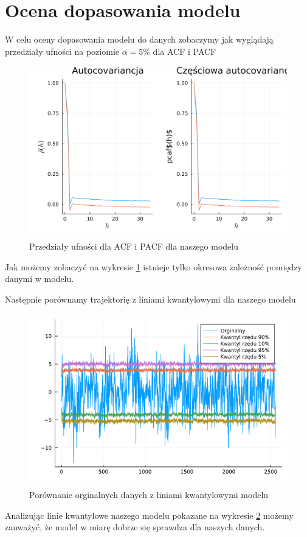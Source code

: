 \documentclass[12pt]{article}
\theoremstyle{exer}
\begin{document}
	
	
	\section{Ocena dopasowania modelu}
	W celu oceny dopasowania modelu do danych zobaczymy jak wyglądają przedziały ufności na poziomie $\alpha = 5\%$ dla ACF i PACF 
	\begin{figure}[H]
		\centering
		\includegraphics[width=3\columnwidth/4]{img/acf_pacf.png}
		\caption{Przedziały ufności dla ACF i PACF dla naszego modelu}
		\label{fig:model_acf_pacf}
	\end{figure}
	Jak możemy zobaczyć na wykresie \ref{fig:model_acf_pacf} istnieje tylko okresowa zależność pomiędzy danymi w modelu.
	
	
	Następnie porównamy trajektorię z liniami kwantylowymi dla naszego modelu
	\begin{figure}[H]
		\centering
		\includegraphics[width=3\columnwidth/4]{img/linie_kwantylowe.png}
		\caption{Porównanie orginalnych danych z liniami kwantylowymi modelu}
		\label{fig:linie_kwantylowe}
	\end{figure}
Analizując linie kwantylowe naszego modelu  pokazane na wykresie \ref{fig:linie_kwantylowe} możemy zauważyć, że model w miarę dobrze się sprawdza dla naszych danych. 
\end{document}

